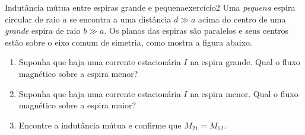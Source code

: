 \begin{exercício}{Indutância mútua entre espiras grande e pequena}{exercício2}
    Uma \emph{pequena} espira circular de raio \(a\) se encontra a uma distância \(d \gg a\) acima do centro de uma \emph{grande} espira de raio \(b \gg a\). Os planos das espiras são paralelos e seus centros estão sobre o eixo comum de simetria, como mostra a figura abaixo.
    \begin{center}
    \end{center}
    \begin{enumerate}[label=(\alph*)]
        \item Suponha que haja uma corrente estacionária \(I\) na espira grande. Qual o fluxo magnético sobre a espira menor?
        \item Suponha que haja uma corrente estacionária \(I\) na espira menor. Qual o fluxo magnético sobre a espira maior?
        \item Encontre a indutância mútua e confirme que \(M_{21} = M_{12}\).
    \end{enumerate}
\end{exercício}
